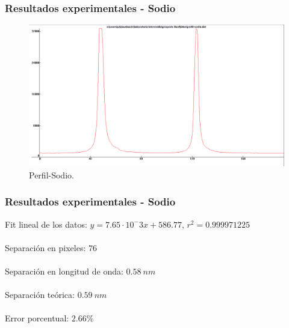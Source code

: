 \documentclass{beamer}
\begin{document}
\begin{frame}[fragile]
	\frametitle{Resultados experimentales - Sodio}
	\begin{figure}[h!]
		\centering
		\includegraphics[width=1.\textwidth,height = 0.7\textheight]{perfil-sodio}
		\caption{Perfil-Sodio.}
	\end{figure}
	

\end{frame}

\begin{frame}[fragile]
	\frametitle{Resultados experimentales - Sodio}

Fit lineal de los datos: $y = 7.65\cdot 10^-3 x + 586.77$,   $r^2 = 0.999971225$  
\
\\

\
\\

Separación en pixeles: $76$
\
\\

\
\\

Separación en longitud de onda: $0.58\ nm$
\
\\

\
\\

Separación teórica: $ 0.59\ nm$
\
\\

\
\\

Error porcentual: $ 2.66\% $

	
	
\end{frame}
\end{document}
